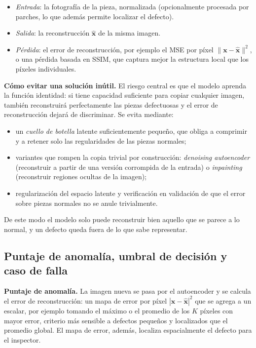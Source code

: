 \documentclass[12pt, a4paper]{article}
\begin{document}
\begin{itemize}[leftmargin=2em]
  \item \emph{Entrada}: la fotografía de la pieza, normalizada (opcionalmente procesada por
        parches, lo que además permite localizar el defecto).
  \item \emph{Salida}: la reconstrucción $\hat{\mathbf{x}}$ de la misma imagen.
  \item \emph{Pérdida}: el error de reconstrucción, por ejemplo el MSE por píxel
        $\|\mathbf{x}-\hat{\mathbf{x}}\|^2$, o una pérdida basada en SSIM, que captura mejor
        la estructura local que los píxeles individuales.
\end{itemize}

\textbf{Cómo evitar una solución inútil.} El riesgo central es que el modelo aprenda la
función identidad: si tiene capacidad suficiente para copiar cualquier imagen, también
reconstruirá perfectamente las piezas defectuosas y el error de reconstrucción dejará de
discriminar. Se evita mediante:
\begin{itemize}[leftmargin=2em]
  \item un \emph{cuello de botella} latente suficientemente pequeño, que obliga a comprimir
        y a retener solo las regularidades de las piezas normales;
  \item variantes que rompen la copia trivial por construcción: \emph{denoising autoencoder}
        (reconstruir a partir de una versión corrompida de la entrada) o \emph{inpainting}
        (reconstruir regiones ocultas de la imagen);
  \item regularización del espacio latente y verificación en validación de que el error
        sobre piezas normales no se anule trivialmente.
\end{itemize}
De este modo el modelo solo puede reconstruir bien aquello que se parece a lo normal, y un
defecto queda fuera de lo que sabe representar.

\subsection{Puntaje de anomalía, umbral de decisión y caso de falla}

\textbf{Puntaje de anomalía.} La imagen nueva se pasa por el autoencoder y se calcula el
error de reconstrucción: un mapa de error por píxel $|\mathbf{x}-\hat{\mathbf{x}}|^2$ que se
agrega a un escalar, por ejemplo tomando el máximo o el promedio de los $K$ píxeles con
mayor error, criterio más sensible a defectos pequeños y localizados que el promedio global.
El mapa de error, además, localiza espacialmente el defecto para el inspector.
\end{document}

